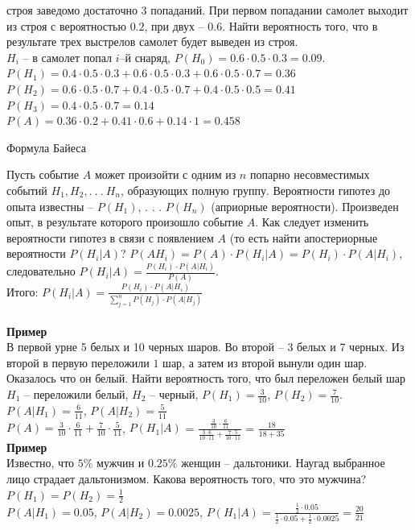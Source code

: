 \documentclass[russian, 12pt, fleqn]{article}
\begin{document}
 строя заведомо достаточно 3 попаданий. При первом попадании самолет выходит из строя с вероятностью $0.2$, при двух -- $0.6$. Найти вероятность того, что в результате трех выстрелов самолет будет выведен из строя.\\
$H_i$ -- в самолет попал $i$--й снаряд, $P(H_0)=0.6\cdot0.5\cdot0.3=0.09$. \\
$P(H_1)=0.4\cdot0.5\cdot0.3+0.6\cdot0.5\cdot0.3+0.6\cdot0.5\cdot0.7=0.36$\\
$P(H_2)=0.6\cdot0.5\cdot 0.7+0.4\cdot0.5\cdot0.7+0.4\cdot0.5\cdot0.5=0.41$\\
$P(H_3)=0.4\cdot0.5\cdot0.7=0.14$\\
$P(A)=0.36\cdot0.2+0.41\cdot0.6+0.14\cdot1=0.458$\\
\begin{center}
$\textbf{Формула Байеса }$
\end{center}
Пусть событие $A$ может произойти с одним из $n$ попарно несовместимых событий $H_1, H_2, .\ .\ .\ H_n$, образующих полную группу. Вероятности гипотез до опыта известны -- $P(H_1)$, . . . $P(H_n)$ (априорные вероятности). Произведен опыт, в результате которого произошло событие $A$. Как следует изменить вероятности гипотез в связи с появлением $A$ (то есть найти апостериорные вероятности $P(H_i|A)$?
$P(AH_i)=P(A)\cdot P(H_i|A) = P(H_i) \cdot P(A|H_i)$, следовательно $P(H_i|A) = \frac{P(H_i) \cdot P(A|H_i)}{P(A)}$.\\
Итого: $P(H_i|A) = \frac{P(H_i)\cdot P(A|H_i)}{ \sum\limits_{j=1}^{n}P(H_j)\cdot P(A|H_j) }$\\
\\
\textbf{Пример\ }\\
В первой урне 5 белых и 10 черных шаров. Во второй -- 3 белых и 7 черных. Из второй в первую переложили $1$ шар, а затем из второй вынули один шар. Оказалось что он белый. Найти вероятность того, что был переложен белый шар\\
$H_1$ -- переложили белый, $H_2$ -- черный, $P(H_1)=\frac{3}{10}$, $P(H_2)=\frac{7}{10}$. $P(A|H_1)=\frac{6}{11}$, $P(A|H_2)=\frac{5}{11}$\\
 $P(A)=\frac{3}{10}\cdot \frac{6}{11} + \frac{7}{10} \cdot \frac{5}{11}$, $P(H_1|A)$ = $\frac {\frac{3}{10}\cdot \frac{6}{11} }   {\frac{3\cdot 6}{10\cdot11} + \frac{7\cdot5}{10\cdot11}  }$ = $\frac{18}{18 + 35}$\\
\textbf{Пример\ }\\
Известно, что $5\%$ мужчин и $0.25\%$ женщин -- дальтоники. Наугад выбранное лицо страдает дальтонизмом. Какова вероятность того, что это мужчина?\\
$P(H_1) = P(H_2) = \frac{1}{2}$\\
$P(A|H_1) = 0.05$, $P(A|H_2) = 0.0025$, $P(H_1|A) = \frac{\frac{1}{2} \cdot 0.05}{ \frac{1}{2} \cdot 0.05 + \frac{1}{2} \cdot 0.0025 } = \frac{20}{21}$\\
\end{document}
